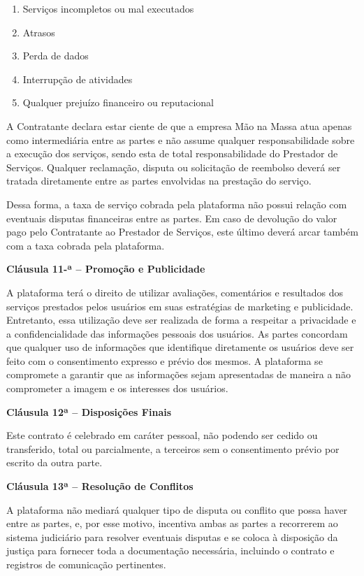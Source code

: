 \documentclass[a4paper,12pt]{article}
\begin{document}
\begin{enumerate}[label=\alph*)]
    \item Serviços incompletos ou mal executados
    \item Atrasos
    \item Perda de dados
    \item Interrupção de atividades
    \item Qualquer prejuízo financeiro ou reputacional
\end{enumerate}

A Contratante declara estar ciente de que a empresa Mão na Massa atua apenas como intermediária entre as partes e não assume qualquer responsabilidade sobre a execução dos serviços, sendo esta de total responsabilidade do Prestador de Serviços. Qualquer reclamação, disputa ou solicitação de reembolso deverá ser tratada diretamente entre as partes envolvidas na prestação do serviço.

Dessa forma, a taxa de serviço cobrada pela plataforma não possui relação com eventuais disputas financeiras entre as partes. Em caso de devolução do valor pago pelo Contratante ao Prestador de Serviços, este último deverá arcar também com a taxa cobrada pela plataforma.

\large{\textbf{Cláusula 11-ª – Promoção e Publicidade}}
\normalsize

A plataforma terá o direito de utilizar avaliações, comentários e resultados dos serviços prestados pelos usuários em suas estratégias de marketing e publicidade. Entretanto, essa utilização deve ser realizada de forma a respeitar a privacidade e a confidencialidade das informações pessoais dos usuários. As partes concordam que qualquer uso de informações que identifique diretamente os usuários deve ser feito com o consentimento expresso e prévio dos mesmos. A plataforma se compromete a garantir que as informações sejam apresentadas de maneira a não comprometer a imagem e os interesses dos usuários.

\large{\textbf{Cláusula 12ª – Disposições Finais}}
\normalsize

Este contrato é celebrado em caráter pessoal, não podendo ser cedido ou transferido, total ou parcialmente, a terceiros sem o consentimento prévio por escrito da outra parte.

\large{\textbf{Cláusula 13ª – Resolução de Conflitos}}
\normalsize

A plataforma não mediará qualquer tipo de disputa ou conflito que possa haver entre as partes, e, por esse motivo, incentiva ambas as partes a recorrerem ao sistema judiciário para resolver eventuais disputas e se coloca à disposição da justiça para fornecer toda a documentação necessária, incluindo o contrato e registros de comunicação pertinentes.
\end{document}
